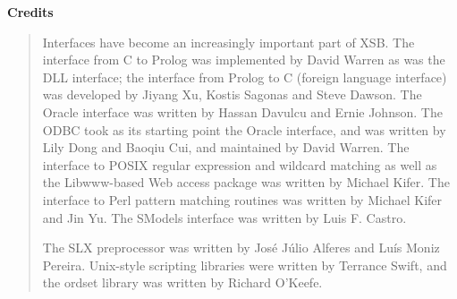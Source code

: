 
\begin{center}
{\bf {\Large 
		Credits
}}
\end{center}


\begin{quote}
  Interfaces have become an increasingly important part of XSB.  The
  interface from C to Prolog was implemented by David Warren as was
  the DLL interface; the interface from Prolog to C (foreign language
  interface) was developed by Jiyang Xu, Kostis Sagonas and Steve
  Dawson.  The Oracle interface was written by Hassan Davulcu and
  Ernie Johnson.  The ODBC took as its starting point the Oracle
  interface, and was written by Lily Dong and Baoqiu Cui, and
  maintained by David Warren.  The interface to POSIX regular
  expression and wildcard matching as well as the Libwww-based Web
  access package was written by Michael Kifer.  The interface to Perl
  pattern matching routines was written by Michael Kifer and Jin Yu.
  The SModels interface was written by Luis F. Castro.
  
  The SLX preprocessor was written by Jos\'e J\'ulio Alferes and
  Lu\'is Moniz Pereira.  Unix-style scripting libraries were written
  by Terrance Swift, and the ordset library was written by Richard
  O'Keefe.
\end{quote}

